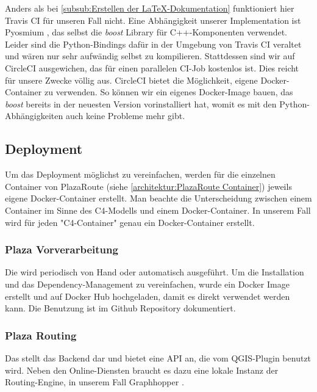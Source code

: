 Anders als bei \ref{subsub:Erstellen der LaTeX-Dokumentation} funktioniert hier Travis CI für unseren Fall nicht. Eine Abhängigkeit unserer Implementation ist Pyosmium \cite{pyosmium}, das selbst die \emph{boost} Library für C++-Komponenten verwendet. Leider sind die Python-Bindings dafür in der Umgebung von Travis CI veraltet und wären nur sehr aufwändig selbst zu kompilieren. Stattdessen sind wir auf CircleCI \cite{circleci} ausgewichen, das für einen parallelen \ac{CI}-Job kostenlos ist. Dies reicht für unsere Zwecke völlig aus. CircleCI bietet die Möglichkeit, eigene Docker-Container zu verwenden. So können wir ein eigenes Docker-Image bauen, das \emph{boost} bereits in der neuesten Version vorinstalliert hat, womit es mit den Python-Abhängigkeiten auch keine Probleme mehr gibt.

\subsection{Deployment}
\label{sub:Deployment}

Um das Deployment möglichst zu vereinfachen, werden für die einzelnen Container von PlazaRoute (siehe \ref{architektur:PlazaRoute Container}) jeweils eigene Docker-Container erstellt. Man beachte die Unterscheidung zwischen einem Container im Sinne des C4-Modells \cite{c4model} und einem Docker-Container. In unserem Fall wird für jeden "C4-Container" genau ein Docker-Container erstellt.

\subsubsection{Plaza Vorverarbeitung}
\label{deployment:Plaza Vorverarbeitung}

Die  wird periodisch von Hand oder automatisch ausgeführt. Um die Installation und das Dependency-Management zu vereinfachen, wurde ein Docker Image erstellt und auf Docker Hub \cite{dockerhub:plazaroute} hochgeladen, damit es direkt verwendet werden kann. Die Benutzung ist im Github Repository \cite{github:PlazaRoute} dokumentiert.

\subsubsection{Plaza Routing}
\label{deployment:Plaza Routing}

Das  stellt das Backend dar und bietet eine API an, die vom QGIS-Plugin benutzt wird. Neben den Online-Diensten braucht es dazu eine lokale Instanz der Routing-Engine, in unserem Fall Graphhopper \cite{graphhopper}.

